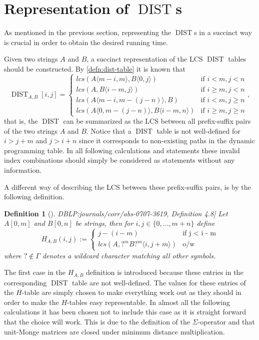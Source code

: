\documentclass[twoside,11pt,openright]{report}
\newcommand{\DIST}{\operatorname{DIST}}
\newcommand{\substr}[3]{#1\langle #2, #3 \rangle}
\newcommand{\str}[3]{#1[#2, #3]}
\newcommand{\refbook}[2]{\cite[#1]{DBLP:journals/corr/abs-0707-3619}, #2}
\newtheorem{mydef}{Definition}
\begin{document}
\section{Representation of $\DIST$s}
As mentioned in the previous section, representing the $\DIST$s in a succinct way is crucial in order to obtain the desired running time.

Given two strings $A$ and $B$, a succinct representation of the LCS $\DIST$ tables should be constructed. By \cref{defn:dist-table} it is known that
\[
  \DIST_{A,B}[i, j] = \left\{
    \begin{array}{ll}
      lcs(\substr{A}{m - i}{m}, \substr{B}{0}{j})             & \text{if } i < m, j < n \\
      lcs(A, \substr{B}{i - m}{j})                            & \text{if } i \geq m, j < n \\
      lcs(\substr{A}{m - i}{m - (j - n)}, B)                  & \text{if } i < m, j \geq n \\
      lcs(\substr{A}{0}{m - (j - n)}, \substr{B}{i - m}{n})   & \text{if } i \geq m, j \geq n
    \end{array}
  \right. ,
\]
that is, the $\DIST$ can be summarized as the LCS between all prefix-suffix pairs of the two strings $A$ and $B$.
Notice that a $\DIST$ table is not well-defined for $i > j + m$ and $j > i + n$ since it corresponds to non-existing paths in the dynamic programming table. In all following calculations and statements these invalid index combinations should simply be considered as statements without any information.

A different way of describing the LCS between these prefix-suffix pairs, is by the following definition.

\begin{mydef}[\refbook{p.-48}{Definition 4.8}]
  \label{def:H-table}
  Let $\str{A}{0}{m}$ and $\str{B}{0}{n}$ be strings, then for $i, j \in \{ 0, \dots, m + n \}$ define
  \[
    H_{A,B}(i, j) := \begin{cases}
                        j - (i - m)                         & \text{if j < i - m} \\
                        lcs(A, \substr{?^mB?^m}{i}{j + m})  & \text{o/w}
                      \end{cases}
  \]
  where $? \not\in \Gamma$ denotes a wildcard character matching all other symbols.
\end{mydef}
The first case in the $H_{A,B}$ definition is introduced because these entries in the corresponding $\DIST$ table are not well-defined. The values for these entries of the $H$-table are simply chosen to make everything work out as they should in order to make the $H$-tables easy representable. In almost all the following calculations it has been chosen not to include this case as it is straight forward that the choice will work. This is due to the definition of the $\Sigma$-operator and that unit-Monge matrices are closed under minimum distance multiplication.
\end{document}
